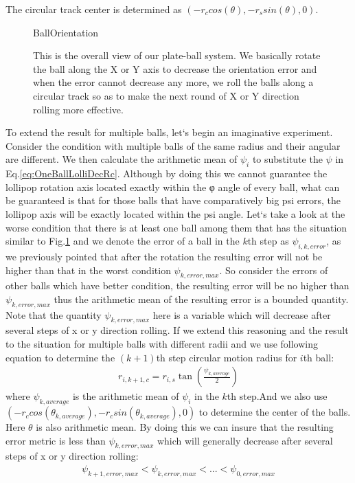 \documentclass[letter paper, 10pt, conference]{ieeeconf}
\begin{document}
The circular track center is determined as $(-r_ccos(\theta), -r_ssin(\theta), 0)$.

    \begin{figure}%
	\begin{center}
	\begin{overpic}[width=.9\columnwidth]{BallOrientation}
	\end{overpic}
	\end{center}
	\vspace{-1em}
	\caption{ \label{fig:BallOrientation} This is the overall view of our plate-ball system. We basically rotate the ball along the X or Y axis to decrease the orientation error and when the error cannot decrease any more, we roll the balls along a circular track so as to make the next round of X or Y direction rolling more effective.  
}\vspace{-1em}
\end{figure}

To extend the result for multiple balls, let`s begin an imaginative experiment. Consider the condition with multiple balls of the same radius and their angular are different. We then calculate the arithmetic mean of $\psi_i$ to substitute the $\psi$ in Eq.\eqref{eq:OneBallLolliDecRc}. Although by doing this we cannot guarantee the lollipop rotation axis located exactly within the φ angle of every ball, what can be guaranteed is that for those balls that have comparatively big psi errors, the lollipop axis will be exactly located within the psi angle. Let`s take a look at the worse condition that there is at least one ball among them that has the situation similar to Fig.\ref{fig:BallOrientation} and we denote the error of a ball in the $k$th step as $\psi_{i,k,error}$, as we previously pointed that after the rotation the resulting error will not be higher than that in the worst condition $\psi_{k,error,max}$. So consider the errors of other balls which have better condition, the resulting error will be no higher  than $\psi_{k,error,max}$ thus the arithmetic mean of the resulting error is a bounded quantity. Note that the quantity $\psi_{k,error,max}$ here is a variable which will decrease after several steps of x or y direction rolling. If we extend this reasoning and the result to the situation for multiple balls with different radii and we use following equation to determine the $(k+1)$th step circular motion radius for $i$th ball:
\begin{align}
r_{i,k+1,c}=r_{i,s}\tan(\frac{\psi_{k,average}}{2}) \label{eq:MultiBallLolliDecRc}
\end{align}
where $\psi_{k,average}$ is the arithmetic mean of $\psi_i$ in the $k$th step.And we also use $(-r_ccos(\theta_{k,average}), -r_csin(\theta_{k,average}), 0)$ to determine the center of the balls. Here $\theta$ is also arithmetic mean. By doing this we can insure that the resulting error metric is less than $\psi_{k,error,max}$ which will generally decrease after several steps of x or y direction rolling:
\begin{align}
\psi_{k+1,error,max}<\psi_{k,error,max}<...<\psi_{0,error,max}\label{eq:ErrorDecrease}
\end{align}
\end{document}
